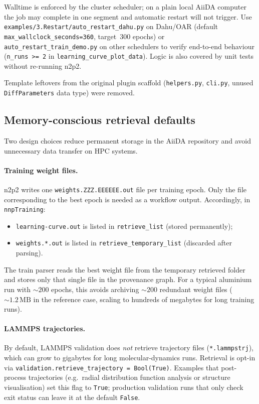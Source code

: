 Walltime is enforced by the cluster scheduler; on a plain local AiiDA computer
the job may complete in one segment and automatic restart will not trigger.
Use \texttt{examples/3.Restart/auto\_restart\_dahu.py} on Dahu/OAR
(default \texttt{max\_wallclock\_seconds=360}, target~300 epochs) or
\texttt{auto\_restart\_train\_demo.py} on other schedulers to verify
end-to-end behaviour (\texttt{n\_runs >= 2} in \texttt{learning\_curve\_plot\_data}).
Logic is also covered by unit tests without re-running n2p2.

Template leftovers from the original plugin scaffold (\texttt{helpers.py},
\texttt{cli.py}, unused \texttt{DiffParameters} data type) were removed.

\subsection{Memory-conscious retrieval defaults}

Two design choices reduce permanent storage in the AiiDA repository and avoid
unnecessary data transfer on HPC systems.

\paragraph{Training weight files.}
n2p2 writes one \texttt{weights.ZZZ.EEEEEE.out} file per training epoch.
Only the file corresponding to the best epoch is needed as a workflow output.
Accordingly, in \texttt{nnpTraining}:
\begin{itemize}
  \item \texttt{learning-curve.out} is listed in \texttt{retrieve\_list}
        (stored permanently);
  \item \texttt{weights.*.out} is listed in \texttt{retrieve\_temporary\_list}
        (discarded after parsing).
\end{itemize}
The train parser reads the best weight file from the temporary retrieved folder and
stores only that single file in the provenance graph.
For a typical aluminium run with ${\sim}200$ epochs, this avoids archiving
${\sim}200$ redundant weight files (${\sim}1.2\,\mathrm{MB}$ in the reference case,
scaling to hundreds of megabytes for long training runs).

\paragraph{LAMMPS trajectories.}
By default, LAMMPS validation does \emph{not} retrieve trajectory files
(\texttt{*.lammpstrj}), which can grow to gigabytes for long molecular-dynamics runs.
Retrieval is opt-in via \texttt{validation.retrieve\_trajectory = Bool(True)}.
Examples that post-process trajectories (e.g.\ radial distribution function analysis
or structure visualisation) set this flag to \texttt{True}; production validation
runs that only check exit status can leave it at the default \texttt{False}.

